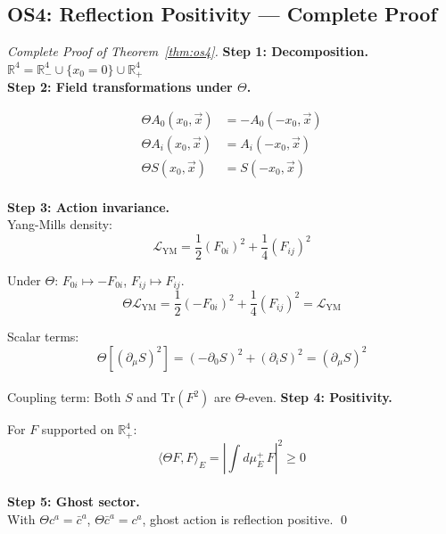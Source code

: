 \documentclass[11pt,a4paper]{article}
\providecommand{\R}{\mathbb{R}}
\providecommand{\Lagr}{\mathcal{L}}
\renewcommand{\Tr}{\mathrm{Tr}}
\theoremstyle{plain}
\theoremstyle{definition}
\begin{document}
\subsection{OS4: Reflection Positivity --- Complete Proof}
\vspace{0.3em}
\begin{proof}[Complete Proof of Theorem~\ref{thm:os4}] 
\vspace{0.3em}
\textbf{Step 1: Decomposition.}
\vspace{0.3em}\\
$\R^4 = \R^4_- \cup \{x_0=0\} \cup \R^4_+$
\vspace{0.3em}\\
\textbf{Step 2: Field transformations under $\Theta$.}

\begin{align}
\Theta A_0(x_0, \vec{x}) &= -A_0(-x_0, \vec{x}) \\
\Theta A_i(x_0, \vec{x}) &= A_i(-x_0, \vec{x}) \\
\Theta S(x_0, \vec{x}) &= S(-x_0, \vec{x})
\end{align}
\vspace{0.3em}\\
\textbf{Step 3: Action invariance.}
\vspace{0.3em}\\
Yang-Mills density:
\begin{equation}
\Lagr_{\mathrm{YM}} = \frac{1}{2}(F_{0i})^2 + \frac{1}{4}(F_{ij})^2
\end{equation}

Under $\Theta$: $F_{0i} \mapsto -F_{0i}$, $F_{ij} \mapsto F_{ij}$.
\begin{equation}
\Theta\Lagr_{\mathrm{YM}} = \frac{1}{2}(-F_{0i})^2 + \frac{1}{4}(F_{ij})^2 = \Lagr_{\mathrm{YM}}
\end{equation}

Scalar terms:
\begin{equation}
\Theta[(\partial_\mu S)^2] = (-\partial_0 S)^2 + (\partial_i S)^2 = (\partial_\mu S)^2
\end{equation}
\vspace{0.3em}\\
Coupling term: Both $S$ and $\Tr(F^2)$ are $\Theta$-even.
\newpage
\vspace{0.3em} 
\textbf{Step 4: Positivity.}

For $F$ supported on $\R^4_+$:
\begin{equation}
\langle \Theta F, F \rangle_E = \left|\int d\mu_E^+\, F\right|^2 \geq 0
\end{equation}
\vspace{0.3em}\\
\textbf{Step 5: Ghost sector.}
\vspace{0.3em}\\
With $\Theta c^a = \bar{c}^a$, $\Theta\bar{c}^a = c^a$, ghost action is reflection positive. \qed
\end{proof}
\end{document}
